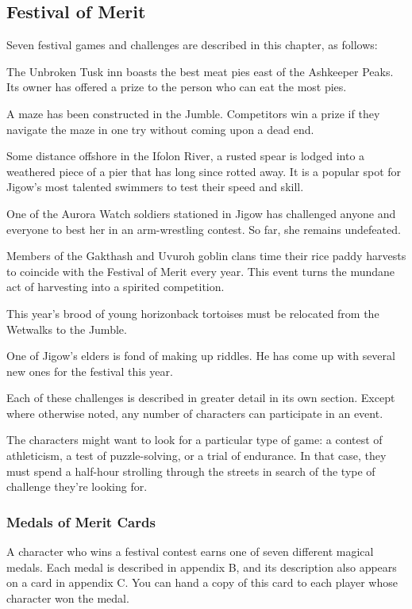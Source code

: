 \documentclass[10pt,a4paper,twoside,bg=print,twocolumn,openany,nodeprecatedcode]{dndbook}
\begin{document}
\subsection{Festival of Merit}
Seven festival games and challenges are described in this chapter, as follows:


\begin{description}[nolistsep]
\item[J1: Best Pies in the Jumble.]
The Unbroken Tusk inn boasts the best meat pies east of the Ashkeeper Peaks. Its owner has offered a prize to the person who can eat the most pies.
\item[J2: One-Shot Solution.]
A maze has been constructed in the Jumble. Competitors win a prize if they navigate the maze in one try without coming upon a dead end.
\item[J3: The Ifolon Plunge.]
Some distance offshore in the Ifolon River, a rusted spear is lodged into a weathered piece of a pier that has long since rotted away. It is a popular spot for Jigow's most talented swimmers to test their speed and skill.
\item[J4: Call to Arms.]
One of the Aurora Watch soldiers stationed in Jigow has challenged anyone and everyone to best her in an arm-wrestling contest. So far, she remains undefeated.
\item[J5: Wetwalks Paddywhack.]
Members of the Gakthash and Uvuroh goblin clans time their rice paddy harvests to coincide with the Festival of Merit every year. This event turns the mundane act of harvesting into a spirited competition.
\item[J6: Herding the Horizonbacks.]
This year's brood of young horizonback tortoises must be relocated from the Wetwalks to the Jumble.
\item[J7: Riddles and Rhymes.]
One of Jigow's elders is fond of making up riddles. He has come up with several new ones for the festival this year.
\end{description}

Each of these challenges is described in greater detail in its own section. Except where otherwise noted, any number of characters can participate in an event.

The characters might want to look for a particular type of game: a contest of athleticism, a test of puzzle-solving, or a trial of endurance. In that case, they must spend a half-hour strolling through the streets in search of the type of challenge they're looking for.

\subsubsection{Medals of Merit Cards}
A character who wins a festival contest earns one of seven different magical medals. Each medal is described in appendix B, and its description also appears on a card in appendix C. You can hand a copy of this card to each player whose character won the medal.
\end{document}
